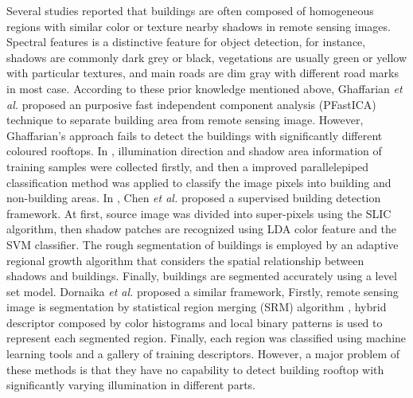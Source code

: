 	Several studies reported that buildings are often composed of homogeneous regions with similar color or texture nearby shadows in remote sensing images. Spectral features is a distinctive feature for object detection, for instance, shadows are commonly dark grey or black, vegetations are usually green or yellow with particular textures, and main roads are dim gray with different road marks in most case. According to these prior knowledge mentioned above, Ghaffarian \textit{et al.}  \cite{ghaffarian2014automaticPFICA} proposed an purposive fast independent component analysis (PFastICA) technique to separate building area from remote sensing image. However, Ghaffarian's approach fails to detect the buildings with significantly different coloured rooftops. In \cite{ghaffarian2014automaticsupervised}, illumination direction and shadow area information of training samples were collected firstly, and then a improved parallelepiped classification method was applied to classify the image pixels into building and non-building areas. In \cite{chen2014shadow}, Chen \textit{et al.} proposed a supervised building detection framework. At first, source image was divided into super-pixels using the SLIC \cite{achanta2012slic} algorithm, then shadow patches are recognized using LDA color feature and the SVM classifier. The rough segmentation of buildings is employed by an adaptive regional growth algorithm that considers the spatial relationship between shadows and buildings. Finally, buildings are segmented accurately using a level set model. Dornaika \textit{et al.} \cite{dornaika2015object} proposed a similar framework,
Firstly, remote sensing image is segmentation  by statistical region merging (SRM) algorithm , hybrid descriptor composed by color histograms and local binary patterns is used to represent each segmented region. Finally, each region was classified using machine learning tools and a gallery of training descriptors. However, a major problem of these methods is that they have no capability to detect building rooftop with significantly varying illumination in different parts.	
	
